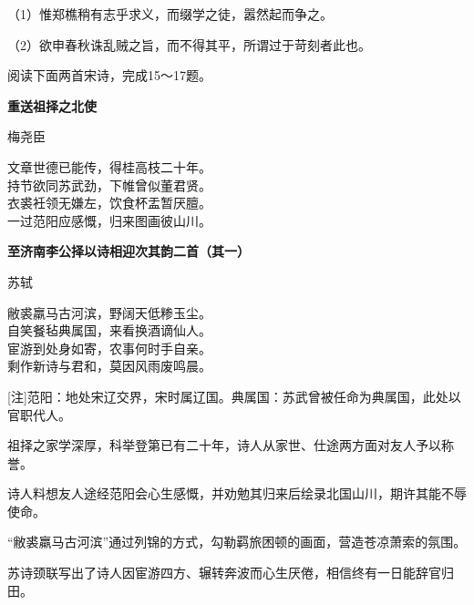 \documentclass[11pt,a4paper]{ctexart}
\begin{document}

（1）惟郑樵稍有志乎求义，而缀学之徒，嚣然起而争之。

（2）欲申春秋诛乱贼之旨，而不得其平，所谓过于苛刻者此也。


\par\vspace{2.2em}

阅读下面两首宋诗，完成15～17题。

\begin{center}{\bfseries 重送祖择之北使}\par\vspace{0.15em}梅尧臣\end{center}

\begin{poem}
文章世德已能传，得桂高枝二十年。\\
持节欲同苏武劲，下帷曾似董君贤。\\
衣裘衽领无嫌左，饮食杯盂暂厌膻。\\
一过范阳应感慨，归来图画彼山川。
\end{poem}

\begin{center}{\bfseries 至济南李公择以诗相迎次其韵二首（其一）}\par\vspace{0.15em}苏轼\end{center}

\begin{poem}
敝裘羸马古河滨，野阔天低糁玉尘。\\
自笑餐毡典属国，来看换酒谪仙人。\\
宦游到处身如寄，农事何时手自亲。\\
剩作新诗与君和，莫因风雨废鸣晨。
\end{poem}

[注]范阳：地处宋辽交界，宋时属辽国。典属国：苏武曾被任命为典属国，此处以官职代人。

\begin{choices}
\item 祖择之家学深厚，科举登第已有二十年，诗人从家世、仕途两方面对友人予以称誉。
\item 诗人料想友人途经范阳会心生感慨，并劝勉其归来后绘录北国山川，期许其能不辱使命。
\item “敝裘羸马古河滨”通过列锦的方式，勾勒羁旅困顿的画面，营造苍凉萧索的氛围。
\item 苏诗颈联写出了诗人因宦游四方、辗转奔波而心生厌倦，相信终有一日能辞官归田。
\end{choices}
\end{document}
